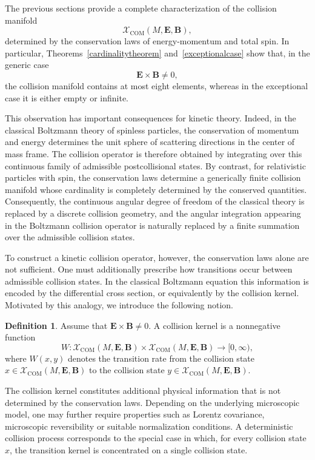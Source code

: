 \documentclass[12pt]{article}
\theoremstyle{plain}
\theoremstyle{definition}
\newtheorem{definition}[theorem]{Definition}
\begin{document}
The previous sections provide a complete characterization of the collision manifold
\[
\mathcal X_{\mathrm{COM}}(M,{\bm E},{\bm B}),
\]
determined by the conservation laws of energy-momentum and total spin. In particular, Theorems~\ref{cardinalitytheorem} and~\ref{exceptionalcase} show that, in the generic case
\[
{\bm E}\times{\bm B}\neq0,
\]
the collision manifold contains at most eight elements, whereas in the exceptional case it is either empty or infinite.

This observation has important consequences for kinetic theory. Indeed, in the classical Boltzmann theory of spinless particles, the conservation of momentum and energy determines the unit sphere of scattering directions in the center of mass frame. The collision operator is therefore obtained by integrating over this continuous family of admissible postcollisional states.
 By contrast, for relativistic particles with spin, the conservation laws determine a generically finite collision manifold whose cardinality is completely determined by the conserved quantities. Consequently, the continuous angular degree of freedom of the classical theory is replaced by a discrete collision geometry, and the angular integration appearing in the Boltzmann collision operator is naturally replaced by a finite summation over the admissible collision states.

To construct a kinetic collision operator, however, the conservation laws alone are not sufficient. One must additionally prescribe how transitions occur between admissible collision states. In the classical Boltzmann equation this information is encoded by the differential cross section, or equivalently by the collision kernel. Motivated by this analogy, we introduce the following notion.

\begin{definition}
Assume that ${\bm E}\times{\bm B}\neq0$. 
A collision kernel is a nonnegative function
\[
W:
\mathcal X_{\mathrm{COM}}(M,{\bm E},{\bm B})
\times
\mathcal X_{\mathrm{COM}}(M,{\bm E},{\bm B})
\longrightarrow
[0,\infty),
\]
where $W(x,y)$ denotes the transition rate from the collision state
$x\in\mathcal X_{\mathrm{COM}}(M,{\bm E},{\bm B})$
to the collision state
$y\in\mathcal X_{\mathrm{COM}}(M,{\bm E},{\bm B})$.
\end{definition}

The collision kernel constitutes additional physical information that is not determined by the conservation laws.  Depending on the underlying microscopic model, one may further require properties such as Lorentz covariance, microscopic reversibility or suitable normalization conditions. A deterministic collision process corresponds to the special case in which, for every collision state $x$, the transition kernel is concentrated on a single collision state.
\end{document}
